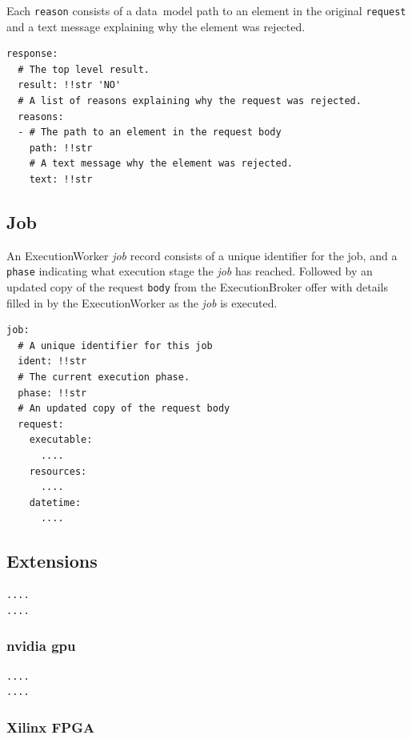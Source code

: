 \documentclass[11pt,a4paper]{ivoa}
\newcommand{\datamodel} {data~model}
\newcommand{\execbrokerclass} {ExecutionBroker}
\newcommand{\execworkerclass} {ExecutionWorker}
\newcommand{\codeword}[1] {\texttt{#1}}
\newcommand{\workerjob} {\textit{job}}
\begin{document}
Each \codeword{reason} consists of a \datamodel{} path to an element in the original
\codeword{request} and a text message explaining why the element was rejected.

\begin{lstlisting}[]
response:
  # The top level result.
  result: !!str 'NO'
  # A list of reasons explaining why the request was rejected.
  reasons:
  - # The path to an element in the request body
    path: !!str
    # A text message why the element was rejected.
    text: !!str
\end{lstlisting}


\subsection{Job}
\label{datamodel-job}

An \execworkerclass{} \workerjob{} record consists of a unique identifier for the job,
and a \codeword{phase} indicating what execution stage the \workerjob{} has reached.
Followed by an updated copy of the request \codeword{body} from the \execbrokerclass{}
offer with details filled in by the \execworkerclass{} as the \workerjob{} is executed.

\begin{lstlisting}[]
job:
  # A unique identifier for this job
  ident: !!str
  # The current execution phase.
  phase: !!str
  # An updated copy of the request body
  request:
    executable:
      ....
    resources:
      ....
    datetime:
      ....
\end{lstlisting}

\subsection{Extensions}
\label{datamodel-extensions}

\begin{lstlisting}[]
....
....
\end{lstlisting}

\subsubsection{nvidia gpu}
\label{datamodel-nvidia-gpu}

\begin{lstlisting}[]
....
....
\end{lstlisting}

\subsubsection{Xilinx FPGA}
\label{datamodel-xilinx-fpga}
\end{document}
